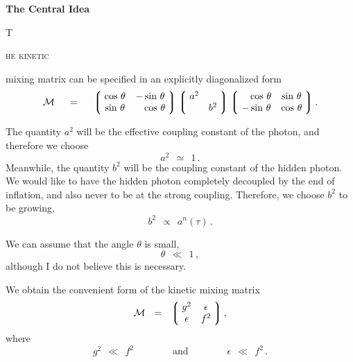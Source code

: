 \documentclass[12pt]{article}
\def\beq{\begin{equation}}
\def\eeq{\end{equation}}
\newcommand{\mc}[1]{\mathcal{#1}}
\newcommand{\ph}{\phantom}
\newcommand{\lgr}{\left\lgroup}
\newcommand{\rgr}{\right\rgroup}
\begin{document}
\centerline{\Huge\bf The Central Idea}

\vspace{2.0mm}

\begin{minipage}[b]{0.76cm}
                \fontsize{44}{12}
                \selectfont
                T
\end{minipage}
\begin{minipage}[b]{3.36cm}
        	\Large{}\selectfont
		\textsc{he kinetic}
\end{minipage}
	mixing matrix can be specified in an explicitly diagonalized form
\beq
	\mc{M}  ~~~~=~~~~  
			\lgr\; \begin{matrix}
				\cos\, \theta    &    - \sin\, \theta \\
				\sin\, \theta    &    \ph- \cos\, \theta
			\end{matrix} \;\rgr
			\lgr\; \begin{matrix}
			     		a^2    &        \\
					       &    b^2
			\end{matrix} \;\rgr
			\lgr\; \begin{matrix}
				\ph-\cos\, \theta    &    \sin\, \theta \\
				- \sin\, \theta    &    \cos\, \theta
			\end{matrix} \;\rgr
			.
\eeq

	The quantity $ a^2 $ will be the effective coupling constant of the photon, and therefore
	we choose 
\[
	a^2  ~~\simeq~~  1\,.
\]
	Meanwhile, the quantity $ b^2 $ will be the coupling constant of the hidden photon.
	We would like to have the hidden photon completely decoupled by the end of inflation, and also
	never to be at the strong coupling.
	Therefore, we choose $ b^2 $ to be growing,
\[
	b^2  ~~\propto~~ a^n(\tau)\,.
\]

	We can assume that the angle $ \theta $ is small,
\[
	\theta  ~~\ll~~  1\,,
\]
	although I do not believe this is necessary.

	We obtain the convenient form of the kinetic mixing matrix
\beq
	\mc{M}  ~~=~~  
			\lgr\; \begin{matrix}
				    g^2         &    \epsilon    \\
				    \epsilon    &    f^2
			     \end{matrix} \;\rgr,
\eeq
	where
\[
	g^2  ~~\ll~~  f^2
	\qquad\qquad
	\text{and}
	\qquad\qquad
	\epsilon  ~~\ll~~  f^2\,.
\]
\end{document}
